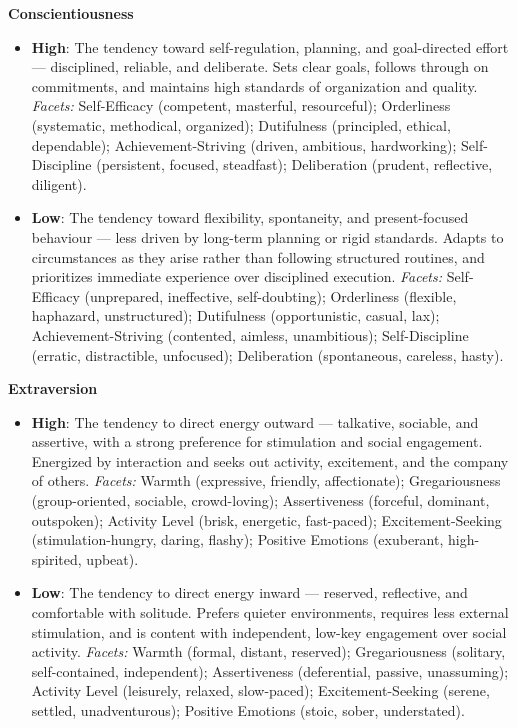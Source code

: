 \textbf{Conscientiousness}
\begin{itemize}
  \item \textbf{High}: The tendency toward self-regulation, planning, and goal-directed effort --- disciplined, reliable, and deliberate. Sets clear goals, follows through on commitments, and maintains high standards of organization and quality.
    \emph{Facets:} Self-Efficacy (competent, masterful, resourceful); Orderliness (systematic, methodical, organized); Dutifulness (principled, ethical, dependable); Achievement-Striving (driven, ambitious, hardworking); Self-Discipline (persistent, focused, steadfast); Deliberation (prudent, reflective, diligent).
  \item \textbf{Low}: The tendency toward flexibility, spontaneity, and present-focused behaviour --- less driven by long-term planning or rigid standards. Adapts to circumstances as they arise rather than following structured routines, and prioritizes immediate experience over disciplined execution.
    \emph{Facets:} Self-Efficacy (unprepared, ineffective, self-doubting); Orderliness (flexible, haphazard, unstructured); Dutifulness (opportunistic, casual, lax); Achievement-Striving (contented, aimless, unambitious); Self-Discipline (erratic, distractible, unfocused); Deliberation (spontaneous, careless, hasty).
\end{itemize}

\textbf{Extraversion}
\begin{itemize}
  \item \textbf{High}: The tendency to direct energy outward --- talkative, sociable, and assertive, with a strong preference for stimulation and social engagement. Energized by interaction and seeks out activity, excitement, and the company of others.
    \emph{Facets:} Warmth (expressive, friendly, affectionate); Gregariousness (group-oriented, sociable, crowd-loving); Assertiveness (forceful, dominant, outspoken); Activity Level (brisk, energetic, fast-paced); Excitement-Seeking (stimulation-hungry, daring, flashy); Positive Emotions (exuberant, high-spirited, upbeat).
  \item \textbf{Low}: The tendency to direct energy inward --- reserved, reflective, and comfortable with solitude. Prefers quieter environments, requires less external stimulation, and is content with independent, low-key engagement over social activity.
    \emph{Facets:} Warmth (formal, distant, reserved); Gregariousness (solitary, self-contained, independent); Assertiveness (deferential, passive, unassuming); Activity Level (leisurely, relaxed, slow-paced); Excitement-Seeking (serene, settled, unadventurous); Positive Emotions (stoic, sober, understated).
\end{itemize}

